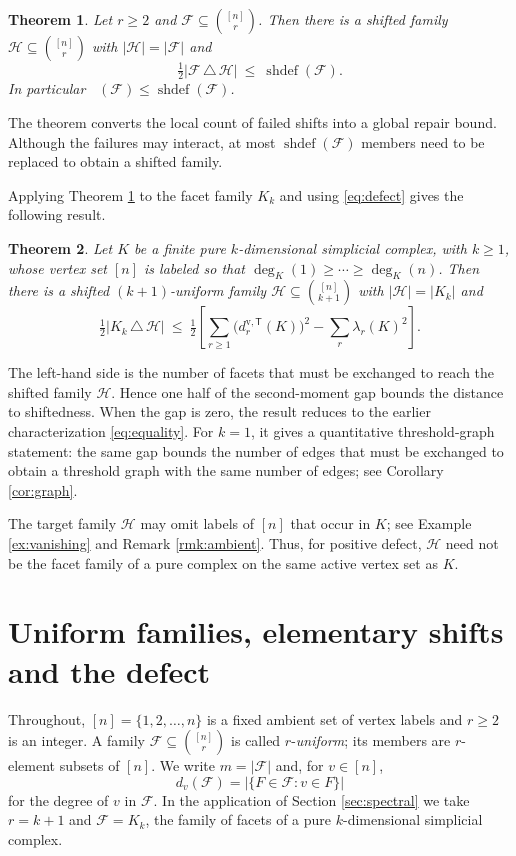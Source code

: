 \documentclass[11pt,reqno]{amsart}
\theoremstyle{plain}
\newtheorem{theorem}{Theorem}[section]
\theoremstyle{definition}
\DeclareMathOperator{\shdef}{shdef}
\DeclareMathOperator{\dsh}{dist_{sh}}
\newcommand{\dvT}[1]{d^{\mathrm{v},\mathsf{T}}_{#1}}
\newcommand{\F}{\mathcal{F}}
\newcommand{\HH}{\mathcal{H}}
\begin{document}
\begin{theorem}\label{thm:introA}
Let $r\ge2$ and $\F\subseteq\binom{[n]}{r}$. Then there is a shifted family
$\HH\subseteq\binom{[n]}{r}$ with
$|\HH|=|\F|$ and
\[
\tfrac12\bigl|\F\,\triangle\,\HH\bigr|\ \le\ \shdef(\F).
\]
In particular $\dsh(\F)\le\shdef(\F)$.
\end{theorem}

The theorem converts the local count of failed shifts into a global repair bound. Although the
failures may interact, at most $\shdef(\F)$ members need to be replaced to obtain a shifted family.

Applying Theorem \ref{thm:introA} to the facet family $K_k$ and using \eqref{eq:defect} gives the
following result.

\begin{theorem}\label{thm:introB}
Let $K$ be a finite pure $k$-dimensional simplicial complex, with $k\ge1$, whose vertex set $[n]$
is labeled so that
$\deg_K(1)\ge\cdots\ge\deg_K(n)$. Then there is a shifted $(k+1)$-uniform family
$\HH\subseteq\binom{[n]}{k+1}$ with $|\HH|=|K_k|$ and
\[
\tfrac12\bigl|K_k\,\triangle\,\HH\bigr|
\ \le\ \tfrac12\left[\sum_{r\ge1}\bigl(\dvT{r}(K)\bigr)^{2}-\sum_{r}\lambda_r(K)^{2}\right].
\]
\end{theorem}

The left-hand side is the number of facets that must be exchanged to reach the shifted family
$\HH$. Hence one half of the second-moment gap bounds the distance to shiftedness. When the gap is
zero, the result reduces to the earlier characterization \eqref{eq:equality}. For $k=1$, it gives a
quantitative threshold-graph statement: the same gap bounds the number of edges that must be
exchanged to obtain a threshold graph with the same number of edges; see Corollary
\ref{cor:graph}.

The target family $\HH$ may omit labels of $[n]$ that occur in $K$; see Example
\ref{ex:vanishing} and Remark \ref{rmk:ambient}. Thus, for positive defect, $\HH$ need not be the
facet family of a pure complex on the same active vertex set as $K$.

\section{Uniform families, elementary shifts and the defect}\label{sec:prelim}

Throughout, $[n]=\{1,2,\dots,n\}$ is a fixed ambient set of vertex labels and $r\ge 2$ is an integer.
A family $\F\subseteq\binom{[n]}{r}$ is called $r$-\emph{uniform}; its members are $r$-element
subsets of $[n]$. We write $m=|\F|$ and, for $v\in[n]$,
\[
d_v(\F)=\bigl|\{F\in\F: v\in F\}\bigr|
\]
for the degree of $v$ in $\F$. In the application of Section \ref{sec:spectral} we take
$r=k+1$ and $\F=K_k$, the family of facets of a pure $k$-dimensional simplicial complex.
\end{document}
